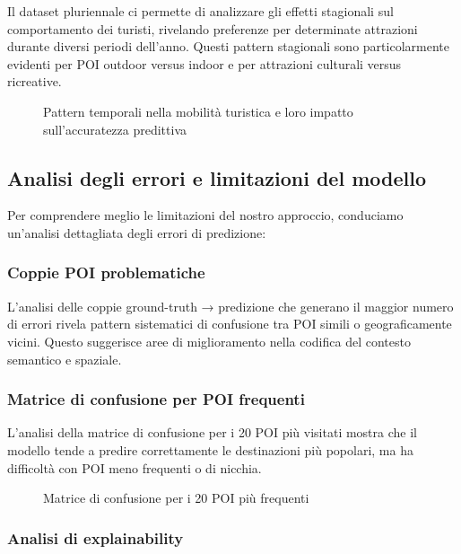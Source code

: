 Il dataset pluriennale ci permette di analizzare gli effetti stagionali sul comportamento dei turisti, rivelando preferenze per determinate attrazioni durante diversi periodi dell'anno. Questi pattern stagionali sono particolarmente evidenti per POI outdoor versus indoor e per attrazioni culturali versus ricreative.

\begin{figure}[H]
\centering
\caption{Pattern temporali nella mobilità turistica e loro impatto sull'accuratezza predittiva}
\label{fig:temporal_analysis}
\end{figure}

\subsection{Analisi degli errori e limitazioni del modello}

Per comprendere meglio le limitazioni del nostro approccio, conduciamo un'analisi dettagliata degli errori di predizione:

\subsubsection{Coppie POI problematiche}

L'analisi delle coppie ground-truth → predizione che generano il maggior numero di errori rivela pattern sistematici di confusione tra POI simili o geograficamente vicini. Questo suggerisce aree di miglioramento nella codifica del contesto semantico e spaziale.

\subsubsection{Matrice di confusione per POI frequenti}

L'analisi della matrice di confusione per i 20 POI più visitati mostra che il modello tende a predire correttamente le destinazioni più popolari, ma ha difficoltà con POI meno frequenti o di nicchia.

\begin{figure}[H]
\centering
\caption{Matrice di confusione per i 20 POI più frequenti}
\label{fig:confusion_matrix}
\end{figure}

\subsubsection{Analisi di explainability}

